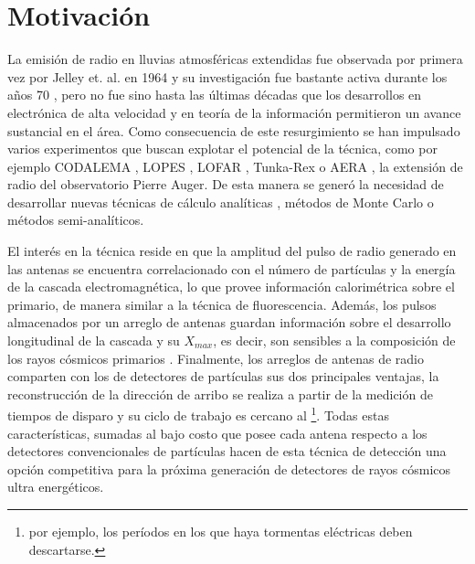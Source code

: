 \chapter*{Motivaci\'on}
\label{ch:motRadio}


La emisi\'on de radio en lluvias atmosf\'ericas extendidas fue observada por primera vez por Jelley et. al. en 1964 \cite{jelley1966radio} y su investigaci\'on fue bastante activa durante los a\~nos 70 \cite{allan1971progress}, pero no fue sino hasta las \'ultimas d\'ecadas que los desarrollos en electr\'onica de alta velocidad y en teor\'ia de la informaci\'on permitieron un avance sustancial en el \'area.
Como consecuencia de este resurgimiento se han impulsado varios experimentos que buscan explotar el potencial de la t\'ecnica, como por ejemplo CODALEMA \cite{ardouin2005radio}, LOPES \cite{huege2012lopes}, LOFAR \cite{horandel2009lofar}, Tunka-Rex \cite{schroder2013tunka} o AERA \cite{kelley2011aera}, la extensi\'on de radio del observatorio Pierre Auger.
De esta manera se gener\'o la necesidad de desarrollar nuevas t\'ecnicas de c\'alculo anal\'iticas \cite{huege2003radio,scholten2008macroscopic}, m\'etodos de Monte Carlo \cite{huege2007monte,ludwig2011reas3} o m\'etodos semi-anal\'iticos\cite{scholten2009macroscopic}.

El interés en la técnica reside en que la amplitud del pulso de radio generado en las antenas se encuentra correlacionado con el número de partículas y la energía de la cascada electromagnética, lo que provee información calorimétrica sobre el primario, de manera similar a la técnica de fluorescencia.
Adem\'as, los pulsos almacenados por un arreglo de antenas guardan información sobre el desarrollo longitudinal de la cascada y su $X_{max}$, es decir, son sensibles a la composici\'on de los rayos c\'osmicos primarios \cite{cite:hauge_rec,cite:lofar_rec}.
Finalmente, los arreglos de antenas de radio comparten con los de detectores de partículas sus dos principales ventajas, la reconstrucción de la dirección de arribo se realiza a partir de la medición de tiempos de disparo y su ciclo de trabajo es cercano al \footnote{por ejemplo, los períodos en los que haya tormentas eléctricas deben descartarse.}.
Todas estas características, sumadas al bajo costo que posee cada antena respecto a los detectores convencionales de partículas hacen de esta técnica de detección una opción competitiva para la próxima generación de detectores de rayos c\'osmicos ultra energ\'eticos.

